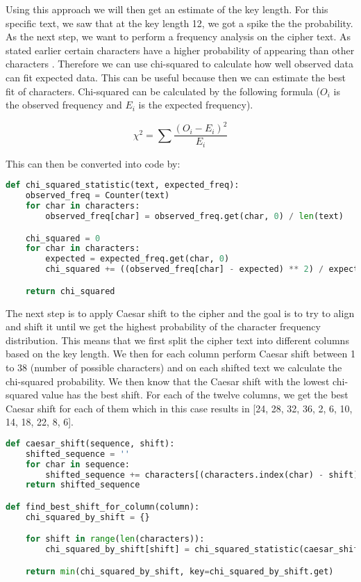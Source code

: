 \documentclass{article}
\begin{document}
Using this approach we will then get an estimate of the key length. For this specific text, we saw that at the key length 12, we got a spike the the probability. As the next step, we want to perform a frequency analysis on the cipher text. As stated earlier certain characters have a higher probability of appearing than other characters \cite{christensen2015cryptanalysis}. Therefore we can use chi-squared to calculate how well observed data can fit expected data. This can be useful because then we can estimate the best fit of characters. Chi-squared can be calculated by the following formula (\(O_i\) is the observed frequency and \(E_i\) is the expected frequency).

\[\chi^2 = \sum \frac{(O_i - E_i)^2}{E_i}\]

This can then be converted into code by:

\begin{lstlisting}[language=Python]
def chi_squared_statistic(text, expected_freq):
    observed_freq = Counter(text)
    for char in characters:
        observed_freq[char] = observed_freq.get(char, 0) / len(text)

    chi_squared = 0
    for char in characters:
        expected = expected_freq.get(char, 0)
        chi_squared += ((observed_freq[char] - expected) ** 2) / expected if expected else 0

    return chi_squared
\end{lstlisting}

The next step is to apply Caesar shift \cite{shiftpdf3:online} to the cipher and the goal is to try to align and shift it until we get the highest probability of the character frequency distribution. This means that we first split the cipher text into different columns based on the key length. We then for each column perform Caesar shift between 1 to 38 (number of possible characters) and on each shifted text we calculate the chi-squared probability. We then know that the Caesar shift with the lowest chi-squared value has the best shift. For each of the twelve columns, we get the best Caesar shift for each of them which in this case results in [24, 28, 32, 36, 2, 6, 10, 14, 18, 22, 8, 6]. 

\begin{lstlisting}[language=Python]
def caesar_shift(sequence, shift):
    shifted_sequence = ''
    for char in sequence:
        shifted_sequence += characters[(characters.index(char) - shift) % len(characters)]
    return shifted_sequence

def find_best_shift_for_column(column):
    chi_squared_by_shift = {}

    for shift in range(len(characters)):
        chi_squared_by_shift[shift] = chi_squared_statistic(caesar_shift(column, shift), english_letter_freq)

    return min(chi_squared_by_shift, key=chi_squared_by_shift.get)
\end{lstlisting}
\end{document}
